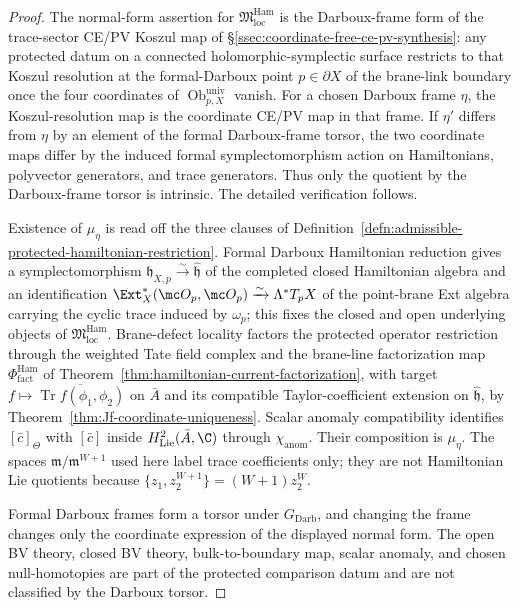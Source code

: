 \begin{proof}
  The normal-form assertion for
  \(\mathfrak M^{\mathrm{Ham}}_{\mathrm{loc}}\) is the
  Darboux-frame form of the trace-sector CE/PV Koszul map of
  \S\ref{ssec:coordinate-free-ce-pv-synthesis}: any protected datum on a
  connected holomorphic-symplectic surface restricts to that Koszul
  resolution at the formal-Darboux point \(p\in\partial X\) of the
  brane-link boundary once the four coordinates of
  \(\operatorname{Ob}^{\mathrm{univ}}_{p,X}\) vanish.  For a chosen
  Darboux frame \(\eta\), the Koszul-resolution map is the coordinate
  CE/PV map in that frame.  If \(\eta'\) differs from \(\eta\) by an
  element of the formal Darboux-frame torsor, the two coordinate maps
  differ by the induced formal symplectomorphism action on Hamiltonians,
  polyvector generators, and trace generators.  Thus only the quotient
  by the Darboux-frame torsor is intrinsic.  The detailed verification
  follows.

  Existence of \(\mu_\eta\) is read off the three
  clauses of
  Definition~\ref{defn:admissible-protected-hamiltonian-restriction}.
  Formal Darboux Hamiltonian reduction gives a symplectomorphism
  \(\mathfrak h_{X,p}\xrightarrow{\sim}\widehat{\mathfrak h}\) of
  the completed closed Hamiltonian algebra and an identification
  \(\Ext^*_X(\mc O_p,\mc O_p)\xrightarrow{\sim}\Lambda^*T_pX\) of
  the point-brane Ext algebra carrying the cyclic trace induced by
  \(\omega_p\); this fixes the closed and open underlying objects
  of \(\mathfrak M^{\mathrm{Ham}}_{\mathrm{loc}}\).  Brane-defect
  locality factors the protected operator restriction through the
  weighted Tate field complex and the brane-line factorization map
  \(\Phi^{\mathrm{Ham}}_{\mathrm{fact}}\) of
  Theorem~\ref{thm:hamiltonian-current-factorization}, with target
  \(f\mapsto\overline{\operatorname{Tr}f(\phi_1,\phi_2)}\) on
  \(\bar A\) and its compatible Taylor-coefficient extension on
  \(\widehat{\mathfrak h}\), by
  Theorem~\ref{thm:Jf-coordinate-uniqueness}.  Scalar anomaly
  compatibility identifies \([\bar c]_\Theta\) with \([\bar c]\)
  inside \(H^2_{\mathrm{Lie}}(\bar A,\C)\) through
  \(\chi_{\mathrm{anom}}\).  Their composition is \(\mu_\eta\).
  The spaces \(\mathfrak m/\mathfrak m^{W+1}\) used here label trace
  coefficients only; they are not Hamiltonian Lie quotients because
  \(\{z_1,z_2^{W+1}\}=(W+1)z_2^W\).

  Formal Darboux frames form a torsor under
  \(G_{\mathrm{Darb}}\), and changing the frame changes only the
  coordinate expression of the displayed normal form.  The open BV
  theory, closed BV theory, bulk-to-boundary map, scalar anomaly, and
  chosen null-homotopies are part of the protected comparison datum and
  are not classified by the Darboux torsor.


\end{proof}

